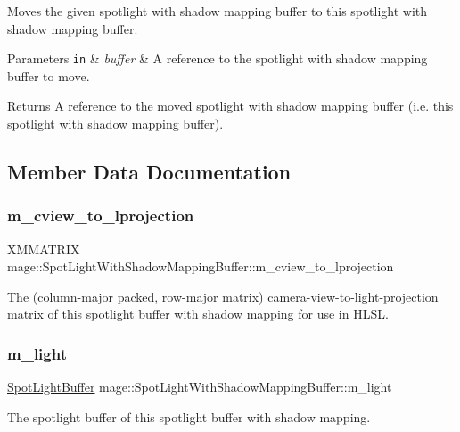 Moves the given spotlight with shadow mapping buffer to this spotlight with shadow mapping buffer.


\begin{DoxyParams}[1]{Parameters}
\mbox{\tt in}  & {\em buffer} & A reference to the spotlight with shadow mapping buffer to move. \\
\hline
\end{DoxyParams}
\begin{DoxyReturn}{Returns}
A reference to the moved spotlight with shadow mapping buffer (i.\+e. this spotlight with shadow mapping buffer). 
\end{DoxyReturn}


\subsection{Member Data Documentation}
\hypertarget{structmage_1_1_spot_light_with_shadow_mapping_buffer_a9f265c3662e441dc1d32dd793198ca5f}{}\label{structmage_1_1_spot_light_with_shadow_mapping_buffer_a9f265c3662e441dc1d32dd793198ca5f} 
\subsubsection{\texorpdfstring{m\+\_\+cview\+\_\+to\+\_\+lprojection}{m\_cview\_to\_lprojection}}
{\footnotesize\ttfamily X\+M\+M\+A\+T\+R\+IX mage\+::\+Spot\+Light\+With\+Shadow\+Mapping\+Buffer\+::m\+\_\+cview\+\_\+to\+\_\+lprojection}

The (column-\/major packed, row-\/major matrix) camera-\/view-\/to-\/light-\/projection matrix of this spotlight buffer with shadow mapping for use in H\+L\+SL. \hypertarget{structmage_1_1_spot_light_with_shadow_mapping_buffer_adf2a7b3790e5ca40141a3bfbd9de19bb}{}\label{structmage_1_1_spot_light_with_shadow_mapping_buffer_adf2a7b3790e5ca40141a3bfbd9de19bb} 
\subsubsection{\texorpdfstring{m\+\_\+light}{m\_light}}
{\footnotesize\ttfamily \hyperlink{structmage_1_1_spot_light_buffer}{Spot\+Light\+Buffer} mage\+::\+Spot\+Light\+With\+Shadow\+Mapping\+Buffer\+::m\+\_\+light}

The spotlight buffer of this spotlight buffer with shadow mapping. 